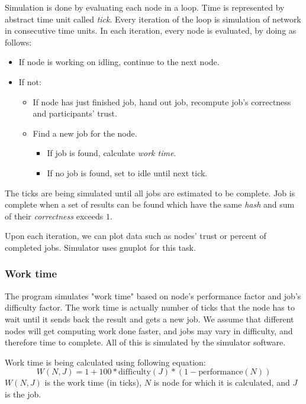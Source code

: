Simulation is done by evaluating each node in a loop. Time is represented by abstract time unit called \emph{tick}. Every iteration of the loop is simulation of network in consecutive time units. In each iteration, every node is evaluated, by doing as follows:
\begin{itemize}
	\item If node is working on idling, continue to the next node.
	\item If not: \begin{itemize}
		\item If node has just finished job, hand out job, recompute job's correctness and participants' trust.
		\item Find a new job for the node. \begin{itemize}
			\item If job is found, calculate \emph{work time}.
			\item If no job is found, set to idle until next tick. 
		\end{itemize}
	\end{itemize}
\end{itemize}

The ticks are being simulated until all jobs are estimated to be complete. Job is complete when a set of results can be found which have the same \emph{hash} and sum of their \emph{correctness} exceeds $1$.

Upon each iteration, we can plot data such as nodes' trust or percent of completed jobs. Simulator uses gnuplot for this task.

\subsubsection{Work time}
\label{s:worktime}

The program simulates "work time" based on node's performance factor and job's difficulty factor. The work time is actually number of ticks that the node has to wait until it sends back the result and gets a new job. We assume that different nodes will get computing work done faster, and jobs may vary in difficulty, and therefore time to complete. All of this is simulated by the simulator software.

Work time is being calculated using following equation:
\begin{equation}
W(N, J) = 1 + 100 * \text{difficulty}(J) * (1 - \text{performance}(N))
\end{equation}
$W(N, J)$ is the work time (in ticks), $N$ is node for which it is calculated, and $J$ is the job.

